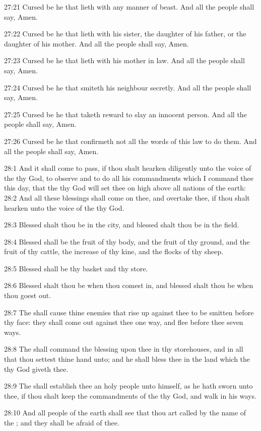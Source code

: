 27:21 Cursed be he that lieth with any manner of beast. And all the people shall say, Amen.

27:22 Cursed be he that lieth with his sister, the daughter of his father, or the daughter of his mother. And all the people shall say, Amen.

27:23 Cursed be he that lieth with his mother in law. And all the people shall say, Amen.

27:24 Cursed be he that smiteth his neighbour secretly. And all the people shall say, Amen.

27:25 Cursed be he that taketh reward to slay an innocent person. And all the people shall say, Amen.

27:26 Cursed be he that confirmeth not all the words of this law to do them. And all the people shall say, Amen.

28:1 And it shall come to pass, if thou shalt hearken diligently unto the voice of the \LORD thy God, to observe and to do all his commandments which I command thee this day, that the \LORD thy God will set thee on high above all nations of the earth: 28:2 And all these blessings shall come on thee, and overtake thee, if thou shalt hearken unto the voice of the \LORD thy God.

28:3 Blessed shalt thou be in the city, and blessed shalt thou be in the field.

28:4 Blessed shall be the fruit of thy body, and the fruit of thy ground, and the fruit of thy cattle, the increase of thy kine, and the flocks of thy sheep.

28:5 Blessed shall be thy basket and thy store.

28:6 Blessed shalt thou be when thou comest in, and blessed shalt thou be when thou goest out.

28:7 The \LORD shall cause thine enemies that rise up against thee to be smitten before thy face: they shall come out against thee one way, and flee before thee seven ways.

28:8 The \LORD shall command the blessing upon thee in thy storehouses, and in all that thou settest thine hand unto; and he shall bless thee in the land which the \LORD thy God giveth thee.

28:9 The \LORD shall establish thee an holy people unto himself, as he hath sworn unto thee, if thou shalt keep the commandments of the \LORD thy God, and walk in his ways.

28:10 And all people of the earth shall see that thou art called by the name of the \LORD; and they shall be afraid of thee.


